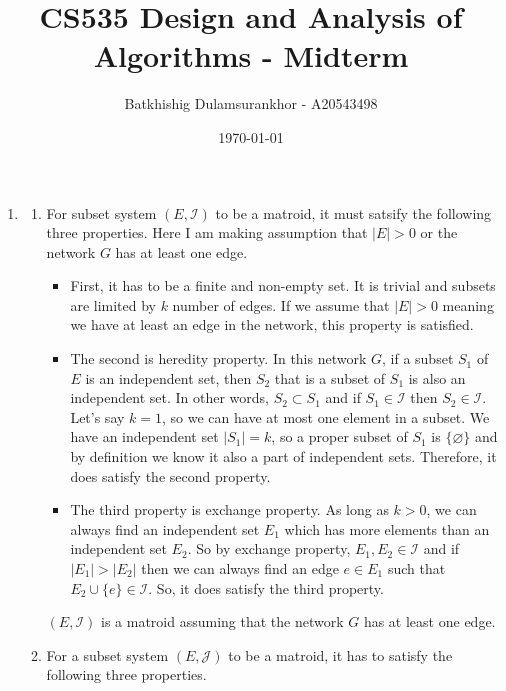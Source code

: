 \documentclass{article}
\title{CS535 Design and Analysis of Algorithms - Midterm}
\author{Batkhishig Dulamsurankhor - A20543498}
\date{\today} %
\begin{document}
\maketitle

\begin{enumerate}
  \item
  \begin{enumerate}
    \item For subset system $(E,\mathcal{I})$ to be a matroid, it must satsify the following three properties.
    Here I am making assumption that $|E|>0$ or the network $G$ has at least one edge.

    \begin{itemize}
      \item First, it has to be a finite and non-empty set. It is trivial and subsets are limited by $k$ number of edges.
      If we assume that $|E|>0$ meaning we have at least an edge in the network, this property is satisfied.
      \item The second is heredity property.
      In this network $G$, if a subset $S_1$ of $E$ is an independent set, then $S_2$ that is a subset of $S_1$ is also an independent set.
      In other words, $S_2\subset S_1$ and if $S_1\in \mathcal{I}$ then $S_2\in \mathcal{I}$.
      Let's say $k=1$, so we can have at most one element in a subset.
      We have an independent set $|S_1|=k$, so a proper subset of $S_1$ is $\{\varnothing\}$ and by definition we know it also a part of independent sets.
      Therefore, it does satisfy the second property.
      \item The third property is exchange property.
      As long as $k>0$, we can always find an independent set $E_1$ which has more elements than an independent set $E_2$.
      So by exchange property, $E_1,E_2\in\mathcal{I}$ and if $|E_1|>|E_2|$ then we can always find an edge $e\in E_1$ such that $E_2\cup\{e\}\in \mathcal{I}$.
      So, it does satisfy the third property.

    \end{itemize}
    $(E,\mathcal{I})$ is a matroid assuming that the network $G$ has at least one edge.

    \item For a subset system $(E,\mathcal{J})$ to be a matroid, it has to satisfy the following three properties.


\end{enumerate}
\end{enumerate}
\end{document}
